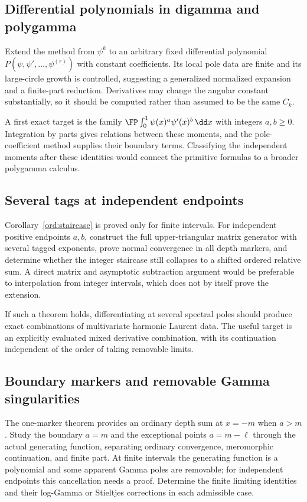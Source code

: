 \subsection{Differential polynomials in digamma and polygamma}

Extend the method from $\psi^k$ to an arbitrary fixed differential
polynomial
$P(\psi,\psi',\ldots,\psi^{(r)})$ with constant coefficients.
Its local pole data are finite and its large-circle growth is
controlled, suggesting a generalized normalized expansion and a
finite-part reduction.  Derivatives may change the angular
constant substantially, so it should be computed rather than
assumed to be the same $C_k$.

A first exact target is the family
$\FP\int_0^1\psi(x)^a\psi'(x)^b\,\dd x$ with integers
$a,b\ge0$.  Integration by parts gives relations between these
moments, and the pole-coefficient method supplies their boundary
terms.  Classifying the independent moments after these identities
would connect the primitive formulas to a broader polygamma calculus.

\subsection{Several tags at independent endpoints}

Corollary~\ref{ord:staircase} is proved only for finite intervals.
For independent positive endpoints $a,b$, construct the full
upper-triangular matrix generator with several tagged exponents,
prove normal convergence in all depth markers, and determine
whether the integer staircase still collapses to a shifted ordered
relative sum.  A direct matrix and asymptotic subtraction argument
would be preferable to interpolation from integer intervals, which
does not by itself prove the extension.

If such a theorem holds, differentiating at several spectral poles
should produce exact combinations of multivariate harmonic Laurent
data.  The useful target is an explicitly evaluated mixed derivative
combination, with its continuation independent of the order of
taking removable limits.

\subsection{Boundary markers and removable Gamma singularities}

The one-marker theorem provides an ordinary depth sum at $x=-m$
when $a>m$.  Study the boundary $a=m$ and the exceptional points
$a=m-\ell$ through the actual generating function, separating
ordinary convergence, meromorphic continuation, and finite part.
At finite intervals the generating function is a polynomial and
some apparent Gamma poles are removable; for independent endpoints
this cancellation needs a proof.  Determine the finite limiting
identities and their log-Gamma or Stieltjes corrections in each
admissible case.

